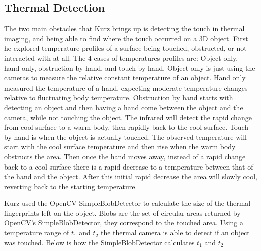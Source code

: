 \documentclass{sig-alternate}
\begin{document}


\subsection{Thermal Detection}
\label{Thermal Detection}
The two main obstacles that Kurz brings up is detecting the touch in thermal imaging, and being able to find where the touch occurred on a 3D object. First he explored temperature profiles of a surface being touched, obstructed, or not interacted with at all. The 4 cases of temperatures profiles are: Object-only, hand-only, obstruction-by-hand, and touch-by-hand. Object-only is just using the cameras to measure the relative constant temperature of an object. Hand only measured the temperature of a hand, expecting moderate temperature changes relative to fluctuating body temperature. Obstruction by hand starts with detecting an object and then having a hand come between the object and the camera, while not touching the object. The infrared will detect the rapid change from cool surface to a warm body, then rapidly back to the cool surface. Touch by hand is when the object is actually touched. The observed temperature  will start with the cool surface temperature and then rise when the warm body obstructs the area. Then once the hand moves away, instead of a rapid change back to a cool surface there is a rapid decrease to a temperature between that of the hand and the object. After this initial rapid decrease the area will slowly cool, reverting back to the starting temperature. 

Kurz used the OpenCV SimpleBlobDetector to calculate the size of the thermal fingerprints left on the object. Blobs are the set of circular areas returned by OpenCV's SimpleBlobDetector, they correspond to the touched area. Using a temperature range of \(t_1\) and \(t_2\) the thermal camera is able to detect if an object was touched. Below is how the SimpleBlobDetector calculates \(t_1\) and \(t_2\)
\end{document}
